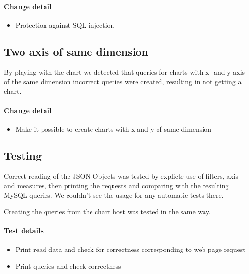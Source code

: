 \paragraph{Change detail}
\begin{itemize}
  \item Protection against SQL injection
\end{itemize}


\subsection{Two axis of same dimension}
By playing with the chart we detected that queries for
charts with x- and y-axis of the same dimension incorrect
queries were created, resulting in not getting a chart.
\paragraph{Change detail}
\begin{itemize}
  \item Make it possible to create charts with x and y of same dimension
\end{itemize}



\subsection{Testing}

Correct reading of the JSON-Objects was tested by explicte use of filters, axis and measures, 
then printing the requests and comparing with the resulting MySQL queries. We couldn't see
the usage for any automatic tests there.

Creating the queries from the chart host was tested in the same way. 

\paragraph{Test details}
\begin{itemize}
  \item Print read data and check for correctness corresponding to web page request
  \item Print queries and check correctness
\end{itemize}
